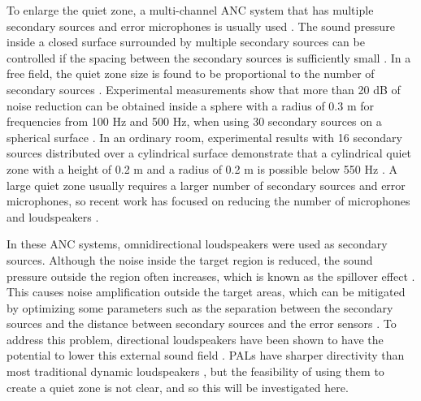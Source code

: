 To enlarge the quiet zone, 
a multi-channel ANC system that has multiple secondary sources and error microphones is usually used  \cite{Zhang2019ActiveNoiseControl}. 
The sound pressure inside a closed surface surrounded by multiple secondary sources can be controlled if the spacing between the secondary sources is sufficiently small \cite{Elliott2018WavenumberApproachAnalysing}. 
In a free field, the quiet zone size is found to be proportional to the number of secondary sources \cite{Guo1997ActivelyCreatedQuiet}.
Experimental measurements show that more than 20 dB of noise reduction can be obtained inside a sphere with a radius of 0.3 m for frequencies from 100 Hz and 500 Hz, when using 30 secondary sources on a spherical surface \cite{Epain2007ActiveControlSound}.
In an ordinary room, experimental results with 16 secondary sources distributed over a cylindrical surface demonstrate that a cylindrical quiet zone with a height of 0.2 m and a radius of 0.2 m is possible below 550 Hz \cite{Zou2007PreliminaryExperimentalStudy}. 
A large quiet zone usually requires a larger number of secondary sources and error microphones, so 
{recent work has focused on} reducing the number of microphones \cite{Maeno2018ModeDomainSpatial} and loudspeakers \cite{Zhang2016MultichannelActiveNoise}. 

In these ANC systems, omnidirectional loudspeakers were used as secondary sources. 
Although the noise inside the target region is reduced, the sound pressure outside the region often increases, which is known as the spillover effect \cite{Guo1997ActivelyCreatedQuiet, Tanaka2010ActiveNoiseControl}. 
{This causes} noise amplification outside the target areas, {which} can be mitigated by optimizing some parameters such as the separation between the secondary sources and the distance between secondary sources and {the} error sensors \cite{Guo1997ActivelyCreatedQuiet, Joseph1994FieldZonesQuiet, David1994NumericalStudiesActively}.
To address this problem, directional loudspeakers have been shown to have the potential to lower this external sound field \cite{Tanaka2010ActiveNoiseControl, Hu2019ActiveCancellationSound}. 
PALs have sharper directivity than most traditional dynamic loudspeakers \cite{Gan2012ReviewParametricAcoustic}, but the feasibility of using them to create a quiet zone is not clear, and so this will be investigated here.


